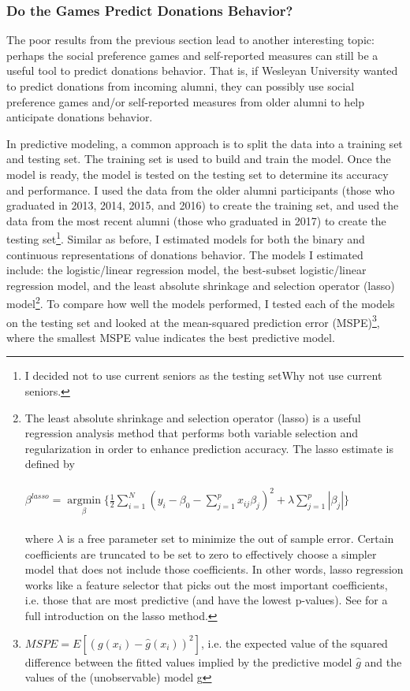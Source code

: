 \documentclass[12pt]{article}
\begin{document}
\subsubsection{Do the Games Predict Donations Behavior?}

The poor results from the previous section lead to another interesting topic: perhaps the social preference games and self-reported measures can still be a useful tool to predict donations behavior. That is, if Wesleyan University wanted to predict donations from incoming alumni, they can possibly use social preference games and/or self-reported measures from older alumni to help anticipate donations behavior.

In predictive modeling, a common approach is to split the data into a training set and testing set. The training set is used to build and train the model. Once the model is ready, the model is tested on the testing set to determine its accuracy and performance. I used the data from the older alumni participants (those who graduated in 2013, 2014, 2015, and 2016) to create the training set, and used the data from the most recent alumni (those who graduated in 2017) to create the testing set\footnote{I decided not to use current seniors as the testing setWhy not use current seniors.}. Similar as before, I estimated models for both the binary and continuous representations of donations behavior. The models I estimated include: the logistic/linear regression model, the best-subset logistic/linear regression model, and the least absolute shrinkage and selection operator (lasso) model\footnote{The least absolute shrinkage and selection operator (lasso) is a useful regression analysis method that performs both variable selection and regularization in order to enhance prediction accuracy. The lasso estimate is defined by\\ \\
\( \beta^{lasso}=\mathop\mathrm{argmin}\limits_{\beta} \{ \frac{1}{2} \sum_{i=1}^{N} (y_{i} - \beta_{0} - \sum_{j=1}^{p}x_{ij}\beta _{j})^{2}+\lambda\sum_{j=1}^{p}|\beta _{j}|\} \) \\ \\
where \(\lambda\) is a free parameter set to minimize the out of sample error. Certain coefficients are truncated to be set to zero to effectively choose a simpler model that does not include those coefficients. In other words, lasso regression works like a feature selector that picks out the most important coefficients, i.e. those that are most predictive (and have the lowest p-values). See \cite{tibshirani_1996} for a full introduction on the lasso method.}. To compare how well the models performed, I tested each of the models on the testing set and looked at the mean-squared prediction error (MSPE)\footnote{\(MSPE = E[(g(x_{i}) - \hat{g}(x_{i}))^{2}]\), i.e. the expected value of the squared difference between the fitted values implied by the predictive model \(\hat{g}\) and the values of the (unobservable) model g}, where the smallest MSPE value indicates the best predictive model.
\end{document}
